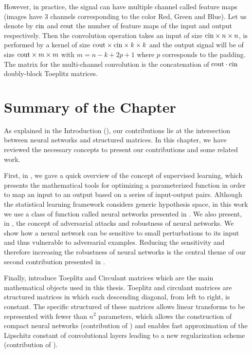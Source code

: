 However, in practice, the signal can have multiple channel called feature maps (\eg images have 3 channels corresponding to the color Red, Green and Blue).
Let us denote by $\mathrm{cin}$ and $\mathrm{cout}$ the number of feature maps of the input and output respectively.
Then the convolution operation takes an input of size $\mathrm{cin} \times n \times n$, is performed by a kernel of size $\mathrm{cout} \times \mathrm{cin} \times k \times k$ and the output signal will be of size $\mathrm{cout} \times m \times m$ with $m = n - k + 2p + 1$ where $p$ corresponds to the padding.
The matrix for the multi-channel convolution is the concatenation of $\mathrm{cout} \cdot \mathrm{cin}$ doubly-block Toeplitz matrices.



\section{Summary of the Chapter}
\label{section:ch2-summary_of_the_background}

As explained in the Introduction (), our contributions lie at the intersection between neural networks and structured matrices.
In this chapter, we have reviewed the necessary concepts to present our contributions and some related work.

First, in , we gave a quick overview of the concept of supervised learning, which presents the mathematical tools for optimizing a parameterized function in order to map an input to an output based on a series of input-output pairs. 
Although the statistical learning framework considers generic hypothesis space, in this work we use a class of function called neural networks presented in .
We also present, in , the concept of adversarial attacks and robustness of neural networks.
We show how a neural network can be sensitive to small perturbations to its input and thus vulnerable to adversarial examples.
Reducing the sensitivity and therefore increasing the robustness of neural networks is the central theme of our second contribution presented in .

Finally,  introduce Toeplitz and Circulant matrices which are the main mathematical objects used in this thesis.
Toeplitz and circulant matrices are structured matrices in which each descending diagonal, from left to right, is constant.
The specific structured of these matrices allows linear transforms to be represented with fewer than $n^2$ parameters, which allows the construction of compact neural networks (contribution of ) and enables fast approximation of the Lipschitz constant of convolutional layers leading to a new regularization scheme (contribution of ).








